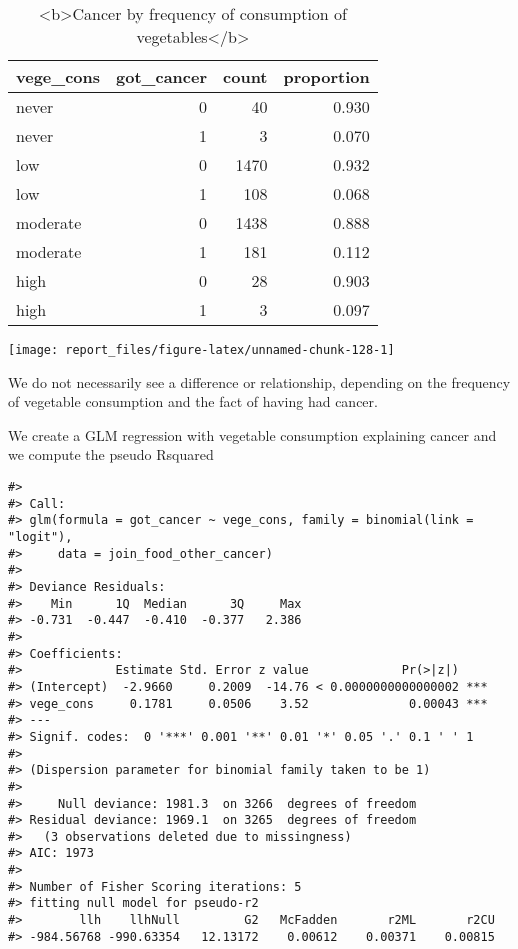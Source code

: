 \documentclass[
]{article}
\begin{document}
\begin{table}

\caption{\label{tab:unnamed-chunk-127}<b>Cancer by frequency of consumption of vegetables</b>}
\centering
\begin{tabular}[t]{l|r|r|r}
\hline
vege\_cons & got\_cancer & count & proportion\\
\hline
never & 0 & 40 & 0.930\\
\hline
never & 1 & 3 & 0.070\\
\hline
low & 0 & 1470 & 0.932\\
\hline
low & 1 & 108 & 0.068\\
\hline
moderate & 0 & 1438 & 0.888\\
\hline
moderate & 1 & 181 & 0.112\\
\hline
high & 0 & 28 & 0.903\\
\hline
high & 1 & 3 & 0.097\\
\hline
\end{tabular}
\end{table}

\begin{center}\texttt{[image: report\_files/figure-latex/unnamed-chunk-128-1]} \end{center}

We do not necessarily see a difference or relationship, depending on the
frequency of vegetable consumption and the fact of having had cancer.

We create a GLM regression with vegetable consumption explaining cancer
and we compute the pseudo Rsquared

\begin{verbatim}
#> 
#> Call:
#> glm(formula = got_cancer ~ vege_cons, family = binomial(link = "logit"), 
#>     data = join_food_other_cancer)
#> 
#> Deviance Residuals: 
#>    Min      1Q  Median      3Q     Max  
#> -0.731  -0.447  -0.410  -0.377   2.386  
#> 
#> Coefficients:
#>             Estimate Std. Error z value             Pr(>|z|)    
#> (Intercept)  -2.9660     0.2009  -14.76 < 0.0000000000000002 ***
#> vege_cons     0.1781     0.0506    3.52              0.00043 ***
#> ---
#> Signif. codes:  0 '***' 0.001 '**' 0.01 '*' 0.05 '.' 0.1 ' ' 1
#> 
#> (Dispersion parameter for binomial family taken to be 1)
#> 
#>     Null deviance: 1981.3  on 3266  degrees of freedom
#> Residual deviance: 1969.1  on 3265  degrees of freedom
#>   (3 observations deleted due to missingness)
#> AIC: 1973
#> 
#> Number of Fisher Scoring iterations: 5
#> fitting null model for pseudo-r2
#>        llh    llhNull         G2   McFadden       r2ML       r2CU 
#> -984.56768 -990.63354   12.13172    0.00612    0.00371    0.00815
\end{verbatim}
\end{document}
